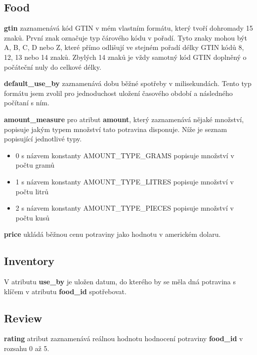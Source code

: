 \documentclass[thesis=B,czech]{FITthesis}[2013/10/20]
\begin{document}
\subsection{Food}

\textbf{gtin} zaznamenává kód GTIN v mém vlastním formátu, který tvoří dohromady 15 znaků. První znak označuje typ čárového kódu v pořadí. Tyto znaky mohou být A, B, C, D nebo Z, které přímo odlišují ve stejném pořadí délky GTIN kódů 8, 12, 13 nebo 14 znaků. Zbylých 14 znaků je vždy samotný kód GTIN doplněný o počáteční nuly do celkové délky.

\textbf{default\_use\_by} zaznamenává dobu běžné spotřeby v milisekundách. Tento typ formátu jsem zvolil pro jednoduchost uložení časového období a následného počítaní s ním.

\textbf{amount\_measure} pro atribut \textbf{amount}, který zaznamenává nějaké množství, popisuje jakým typem množství tato potravina disponuje. Níže je seznam popisující jednotlivé typy.

\begin{itemize}
  \item 0 s názvem konstanty AMOUNT\_TYPE\_GRAMS popisuje množství v počtu gramů
  \item 1 s názvem konstanty AMOUNT\_TYPE\_LITRES popisuje množství v počtu litrů
  \item 2 s názvem konstanty AMOUNT\_TYPE\_PIECES popisuje množství v počtu kusů
\end{itemize}

\textbf{price} ukládá běžnou cenu potraviny jako hodnotu v americkém dolaru.

\subsection{Inventory}
V atributu \textbf{use\_by} je uložen datum, do kterého by se měla dná potravina s klíčem v atributu \textbf{food\_id} spotřebovat.

\subsection{Review}
\textbf{rating} atribut zaznamenává reálnou hodnotu hodnocení potraviny \textbf{food\_id} v rozsahu 0 až 5.
\end{document}

